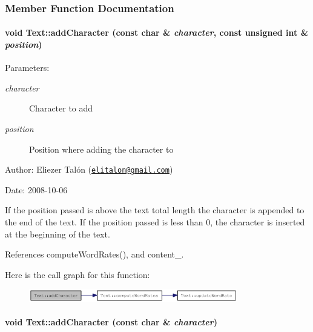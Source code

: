 \subsubsection{Member Function Documentation}
\hypertarget{class_text_fdd11ad0c90ca483d4cff3d74a64da9e}{
\paragraph[{addCharacter}]{\setlength{\rightskip}{0pt plus 5cm}void Text::addCharacter (const char \& {\em character}, \/  const unsigned int \& {\em position})}\hfill}
\label{class_text_fdd11ad0c90ca483d4cff3d74a64da9e}


\begin{Desc}
\item[Parameters:]
\begin{description}
\item[{\em character}]Character to add \item[{\em position}]Position where adding the character to\end{description}
\end{Desc}
\begin{Desc}
\item[Author:]Eliezer Talón (\href{mailto:elitalon@gmail.com}{\tt elitalon@gmail.com}) \end{Desc}
\begin{Desc}
\item[Date:]2008-10-06\end{Desc}
If the position passed is above the text total length the character is appended to the end of the text. If the position passed is less than 0, the character is inserted at the beginning of the text. 

References computeWordRates(), and content\_\-.

Here is the call graph for this function:\nopagebreak
\begin{figure}[H]
\begin{center}
\leavevmode
\includegraphics[width=258pt]{class_text_fdd11ad0c90ca483d4cff3d74a64da9e_cgraph}
\end{center}
\end{figure}
\hypertarget{class_text_6e6da63c90af68639adc7dd1336f6bf9}{
\paragraph[{addCharacter}]{\setlength{\rightskip}{0pt plus 5cm}void Text::addCharacter (const char \& {\em character})}\hfill}
\label{class_text_6e6da63c90af68639adc7dd1336f6bf9}


